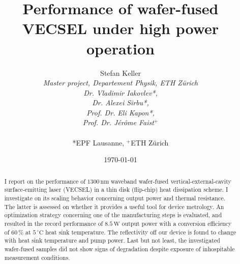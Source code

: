\documentclass[11pt, a4paper, twoside]{article}
\title{Performance of wafer-fused VECSEL under high power operation}
\author{Stefan Keller\\
{\it Master project, Departement Physik, ETH Z\"urich}\\
{\it Dr. Vladimir Iakovlev*,}\\
{\it Dr. Alexei Sirbu*,}\\
{\it Prof. Dr. Eli Kapon*,}\\
{\it Prof. Dr. J\'er\^ome Faist$^+$}\\
\\
*EPF Lausanne, $^+$ETH Z\"urich}
\date{\today}
\newcommand{\degr}[1]{$#1\,^\circ\mathrm{C}$}
\numberwithin{equation}{section} %
\numberwithin{table}{section}
\numberwithin{figure}{section}
\begin{document}
\maketitle
{}
\fancyhead[LO]{\leftmark}

\begin{abstract}
I report on the performance
of $1300\,\mathrm{nm}$ waveband
wafer-fused vertical-external-cavity
surface-emitting laser (VECSEL)
in a thin disk (flip-chip) heat dissipation scheme.
I investigate on its scaling behavior
concerning output power
and thermal resistance.
The latter is assessed
on whether it provides
a useful tool
for device metrology.
An optimization strategy
concerning one of the manufacturing steps
is evaluated,
and resulted
in the record performance
of $8.5\,\mathrm{W}$
output power
with a conversion efficiency
of $60\,\%$ at \degr{5}
heat sink temperature.
The reflectivity
off our device
is found to change
with heat sink temperature
and pump power.
Last but not least,
the investigated wafer-fused samples
did not show signs of degradation
despite exposure of
inhospitable measurement conditions.
\end{abstract}

\tableofcontents\newpage









\newpage
\appendix




\newpage

\end{document}
